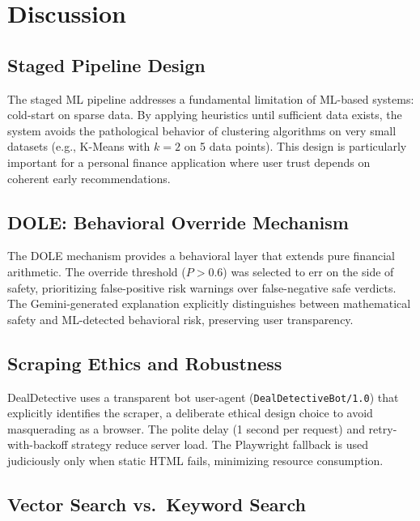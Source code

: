 \documentclass[]{IEEEtran}
\begin{document}
\section{Discussion}
\label{sec:discussion}

\subsection{Staged Pipeline Design}

The staged ML pipeline addresses a fundamental limitation of ML-based systems: cold-start on sparse data. By applying heuristics until sufficient data exists, the system avoids the pathological behavior of clustering algorithms on very small datasets (e.g., K-Means with $k=2$ on 5 data points). This design is particularly important for a personal finance application where user trust depends on coherent early recommendations.

\subsection{DOLE: Behavioral Override Mechanism}

The DOLE mechanism provides a behavioral layer that extends pure financial arithmetic. The override threshold ($P > 0.6$) was selected to err on the side of safety, prioritizing false-positive risk warnings over false-negative safe verdicts. The Gemini-generated explanation explicitly distinguishes between mathematical safety and ML-detected behavioral risk, preserving user transparency.

\subsection{Scraping Ethics and Robustness}

DealDetective uses a transparent bot user-agent (\texttt{DealDetectiveBot/1.0}) that explicitly identifies the scraper, a deliberate ethical design choice to avoid masquerading as a browser. The polite delay (1 second per request) and retry-with-backoff strategy reduce server load. The Playwright fallback is used judiciously only when static HTML fails, minimizing resource consumption.

\subsection{Vector Search vs.\ Keyword Search}
\end{document}
